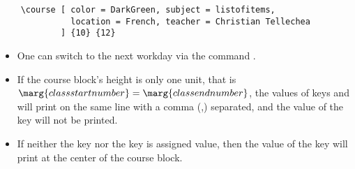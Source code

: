 \documentclass[letterpaper]{l3doc}
\begin{document}
\begin{Verbatim}
    \course [ color = DarkGreen, subject = listofitems, 
              location = French, teacher = Christian Tellechea
            ] {10} {12}
\end{Verbatim}

\begin{center}
    \noindent{}
\end{center}

\begin{itemize}
    \item One can switch to the next workday via the command .
    \item If the course block's height is only one unit, that is $\marg{class start number} = \marg{class end number}$, the values of keys  and  will print on the same line with a comma (,) separated, and the value of the key  will not be printed.
    \item If neither the key  nor the key  is assigned value, then the value of the key  will print at the center of the course block.
\end{itemize}


\end{document}
